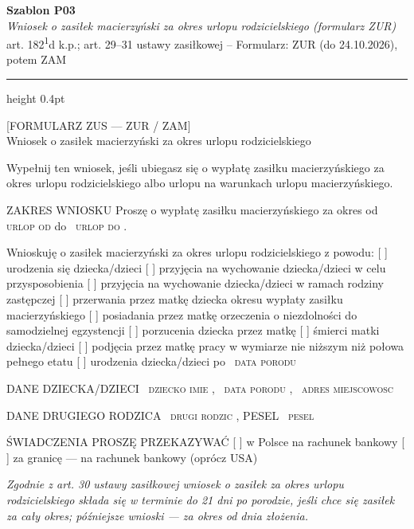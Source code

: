 \documentclass[11pt,a4paper]{article}
\newcommand{\Pole}[1]{%
  \textcolor{szary}{\dotfill}\,%
  {\scriptsize\textcolor{szary}{\textsc{#1}}}%
}
\begin{document}
\begin{flushright}
{\footnotesize\color{szary}
\textbf{Szablon P03}\\
{\itshape Wniosek o zasiłek macierzyński za okres urlopu rodzicielskiego (formularz ZUR)}\\
art. 182\textsuperscript{1}d k.p.; art. 29--31 ustawy zasiłkowej -- Formularz: ZUR (do 24.10.2026), potem ZAM}\
\end{flushright}

\vspace{0.5em}
{\color{ramka}\hrule height 0.4pt}
\vspace{0.8em}

[FORMULARZ ZUS --- ZUR / ZAM]\\[-2pt]
Wniosek o zasiłek macierzyński za okres urlopu rodzicielskiego

Wypełnij ten wniosek, jeśli ubiegasz się o wypłatę zasiłku macierzyńskiego
za okres urlopu rodzicielskiego albo urlopu na warunkach urlopu macierzyńskiego.

ZAKRES WNIOSKU
Proszę o wypłatę zasiłku macierzyńskiego za okres od \Pole{urlop od} do \Pole{urlop do}.

Wnioskuję o zasiłek macierzyński za okres urlopu rodzicielskiego z powodu:
[ ] urodzenia się dziecka/dzieci
[ ] przyjęcia na wychowanie dziecka/dzieci w celu przysposobienia
[ ] przyjęcia na wychowanie dziecka/dzieci w ramach rodziny zastępczej
[ ] przerwania przez matkę dziecka okresu wypłaty zasiłku macierzyńskiego
[ ] posiadania przez matkę orzeczenia o niezdolności do samodzielnej egzystencji
[ ] porzucenia dziecka przez matkę
[ ] śmierci matki dziecka/dzieci
[ ] podjęcia przez matkę pracy w wymiarze nie niższym niż połowa pełnego etatu
[ ] urodzenia dziecka/dzieci po \Pole{data porodu}

DANE DZIECKA/DZIECI
\Pole{dziecko imie}, \Pole{data porodu}, \Pole{adres miejscowosc}

DANE DRUGIEGO RODZICA
\Pole{drugi rodzic}, PESEL \Pole{pesel}

ŚWIADCZENIA PROSZĘ PRZEKAZYWAĆ
[ ] w Polsce na rachunek bankowy
[ ] za granicę --- na rachunek bankowy (oprócz USA)

\vfill
{\footnotesize\textcolor{szary}\itshape Zgodnie z art. 30 ustawy zasiłkowej wniosek o zasiłek za okres urlopu rodzicielskiego składa się w terminie do 21 dni po porodzie, jeśli chce się zasiłek za cały okres; późniejsze wnioski --- za okres od dnia złożenia. }
\end{document}
